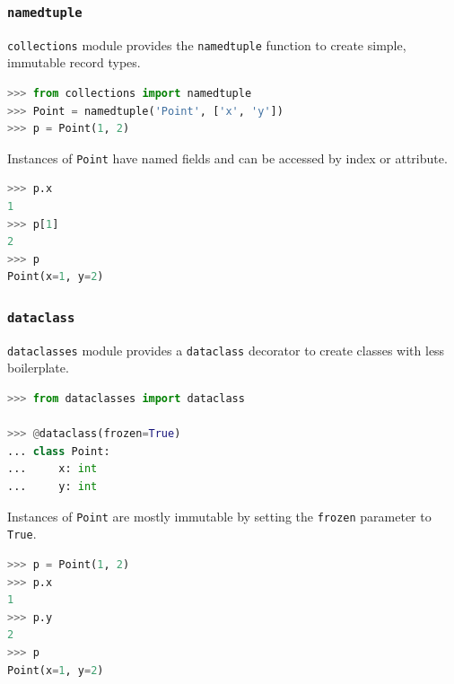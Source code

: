\documentclass[envcountsect,10pt]{beamer}
\begin{document}
\begin{frame}[fragile]
    \frametitle{\texttt{namedtuple}}

    \texttt{collections} module provides the \texttt{namedtuple} function to create simple, immutable record types.

    \begin{lstlisting}[language=Python]
>>> from collections import namedtuple
>>> Point = namedtuple('Point', ['x', 'y'])
>>> p = Point(1, 2)
    \end{lstlisting}

    Instances of \texttt{Point} have named fields and can be accessed by index or attribute.

    \begin{lstlisting}[language=Python]
>>> p.x
1
>>> p[1]
2
>>> p
Point(x=1, y=2)
    \end{lstlisting}

\end{frame}

\begin{frame}[fragile]
    \frametitle{\texttt{dataclass}}

    \texttt{dataclasses} module provides a \texttt{dataclass} decorator to create classes with less boilerplate.

    \begin{lstlisting}[language=Python]
>>> from dataclasses import dataclass

>>> @dataclass(frozen=True)
... class Point:
...     x: int
...     y: int
    \end{lstlisting}

    Instances of \texttt{Point} are mostly immutable by setting the \texttt{frozen} parameter to \texttt{True}.

    \begin{lstlisting}[language=Python]
>>> p = Point(1, 2)
>>> p.x
1
>>> p.y
2
>>> p
Point(x=1, y=2)
    \end{lstlisting}

\end{frame}
\end{document}
